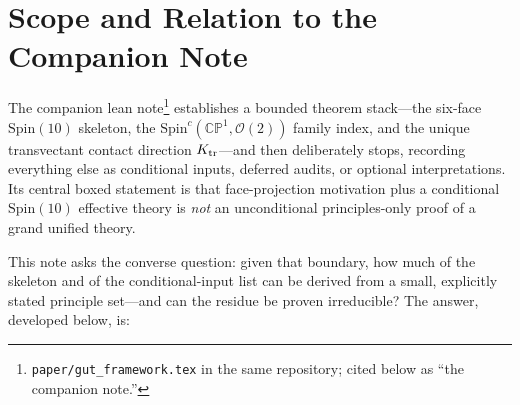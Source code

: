 \documentclass[
  aps,
  prd,
  preprint,
  nofootinbib,
  superscriptaddress,
  longbibliography
]{revtex4-2}
\newcommand{\Spin}{\mathrm{Spin}}
\newcommand{\CP}{\mathbb{CP}}
\newcommand{\cO}{\mathcal{O}}
\begin{document}
\begin{abstract}
any such principle set: the companion note's boxed corollary is thereby
upgraded from a claim boundary to a theorem.  Every arithmetic and
linear-algebra step is reproduced by two machine audits (44 + 24 checks);
the second closes the former classical-input citations by direct
computation, including the longest-Weyl-element classification of complex
representations and the exactly vanishing cubic anomaly tensor of the
\(16\) built from five fermionic modes.  String-theoretic readings enter
only as optional interpretations.  This note adds no phenomenology; the
companion dynamics audits are mechanically executed, but their physics
promotion remains blocked by the open items listed below.
\end{abstract}

\maketitle

\section{Scope and Relation to the Companion Note}
\label{sec:scope}

The companion lean note\footnote{\texttt{paper/gut\_framework.tex} in the
same repository; cited below as ``the companion note.''} establishes a
bounded theorem stack---the six-face \(\Spin(10)\) skeleton, the
\(\Spin^c(\CP^1,\cO(2))\) family index, and the unique transvectant contact
direction \(K_{\rm tr}\)---and then deliberately stops, recording everything
else as conditional inputs, deferred audits, or optional interpretations.
Its central boxed statement is that face-projection motivation plus a
conditional \(\Spin(10)\) effective theory is \emph{not} an unconditional
principles-only proof of a grand unified theory.

This note asks the converse question: given that boundary, how much of the
skeleton and of the conditional-input list can be derived from a small,
explicitly stated principle set---and can the residue be proven
irreducible?  The answer, developed below, is:
\end{document}
